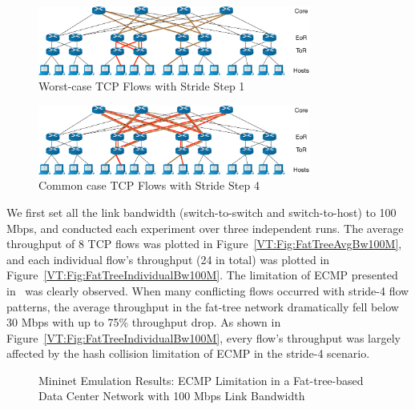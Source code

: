 \begin{figure}[ht]
\centering
\includegraphics[width=0.8\textwidth]{VirtualTime/figures/TopoFatTreeExampleStride1.eps}
\caption{Worst-case TCP Flows with Stride Step 1}
\label{VT:Fig:FattreeTopoExampleStride1}
\end{figure}

\begin{figure}[ht]
\centering
\includegraphics[width=0.8\textwidth]{VirtualTime/figures/TopoFatTreeExampleStride4.eps}
\caption{Common case TCP Flows with Stride Step 4}
\label{VT:Fig:FattreeTopoExampleStride4}
\end{figure}

We first set all the link bandwidth (switch-to-switch and switch-to-host) to 100 Mbps,
and conducted each experiment over three independent runs.
The average throughput of 8 TCP flows was plotted in Figure~\ref{VT:Fig:FatTreeAvgBw100M},
and each individual flow's throughput (24 in total) was plotted in Figure~\ref{VT:Fig:FatTreeIndividualBw100M}.
The limitation of ECMP presented in~\cite{Hedera} was clearly observed.
When many conflicting flows occurred with stride-4 flow patterns,
the average throughput in the fat-tree network dramatically fell below 30 Mbps with up to 75\% throughput drop.
As shown in Figure~\ref{VT:Fig:FatTreeIndividualBw100M}, every flow's throughput was largely
affected by the hash collision limitation of ECMP in the stride-4 scenario.

\begin{figure}[ht]
\centering
\caption[Emulate ECMP with Low Link Bandwidth]{Mininet Emulation Results: ECMP Limitation in a Fat-tree-based Data Center Network with 100 Mbps Link Bandwidth}
\end{figure}


